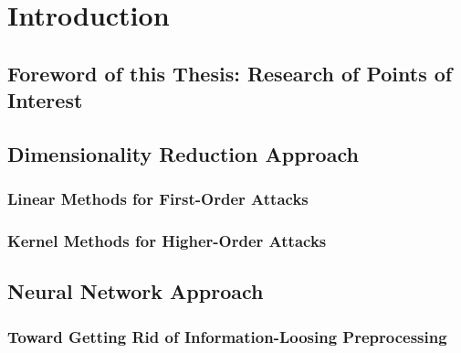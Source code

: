 \chapter{Introduction}

\section{Foreword of this Thesis: Research of Points of Interest}
\section{Dimensionality Reduction Approach}
\subsection{Linear Methods for First-Order Attacks}
\subsection{Kernel Methods for Higher-Order Attacks}
\section{Neural Network Approach}
\subsection{Toward Getting Rid of Information-Loosing Preprocessing}